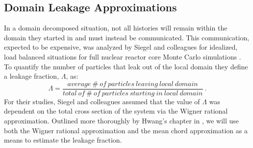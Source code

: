 \documentclass{mc2013}
\begin{document}
\subsection{Domain Leakage Approximations}
\label{subsec:domain_leak_approx}

In a domain decomposed situation, not all histories will remain within
the domain they started in and must instead be communicated. This
communication, expected to be expensive, was analyzed by Siegel and
colleagues for idealized, load balanced situations for full nuclear
reactor core Monte Carlo simulations \cite{siegel_analysis_2012}.  To
quantify the number of particles that leak out of the local domain
they define a leakage fraction, $\Lambda$, as:
\begin{equation}
  \Lambda = \frac{average\ \#\ of\ particles\ leaving\ local\ domain}
          {total\ of\ \#\ of\ particles\ starting\ in\ local\ domain}\:.
          \label{eq:leakage_fraction}
\end{equation}
For their studies, Siegel and colleagues assumed that the value of
$\Lambda$ was dependent on the total cross section of the system via
the Wigner rational approximation. Outlined more thoroughly by Hwang's
chapter in \cite{azmy_nuclear_2010}, we will use both the Wigner
rational approximation and the mean chord approximation as a means to
estimate the leakage fraction.
\end{document}
